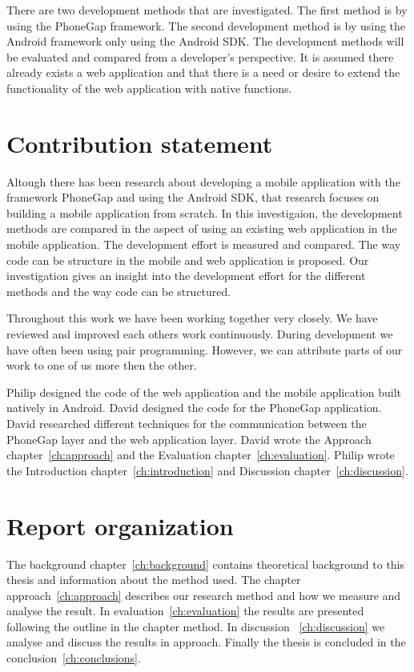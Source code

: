 There are two development methods that are investigated. The first method is by using the PhoneGap framework. The second development method is by using the Android framework only using the Android SDK. The development methods will be evaluated and compared from a developer's perspective. It is assumed there already exists	a web application and that there is a need or desire to extend the functionality of the web application with native functions.

\section{Contribution statement}\label{sec:contribution-statement}
Altough there has been research about developing a mobile application with the framework PhoneGap and using the Android SDK, that research focuses on building a mobile application from scratch. In this investigaion, the development methods are compared in the aspect of using an existing web application in the mobile application. The development effort is measured and compared. The way code can be structure in the mobile and web application is proposed. Our investigation gives an insight into the development effort for the different methods and the way code can be structured.

Throughout this work we have been working together very closely. We have reviewed and improved each others work continuously. During development we have often been using pair programming. However, we can attribute parts of our work to one of us more then the other.

Philip designed the code of the web application and the mobile application built natively in Android. David designed the code for the PhoneGap application. David researched different techniques for the communication between the PhoneGap layer and the web application layer. David wrote the Approach chapter~\ref{ch:approach} and the Evaluation chapter~\ref{ch:evaluation}. Philip wrote the Introduction chapter~\ref{ch:introduction} and Discussion chapter~\ref{ch:discussion}.

\section{Report organization}\label{sec:report-organization}
The background chapter~\ref{ch:background} contains theoretical background to this thesis and information about the method used. The chapter approach~\ref{ch:approach} describes our research method and how we measure and analyse the result. In evaluation~\ref{ch:evaluation} the results are presented following the outline in the chapter method. In discussion ~\ref{ch:discussion} we analyse and discuss the results in approach. Finally the thesis is concluded in the conclusion~\ref{ch:conclusions}.
